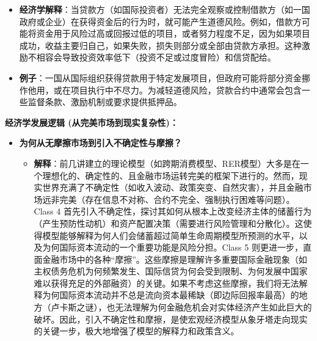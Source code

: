 \documentclass[12pt]{article}
\begin{document}
\begin{itemize}
    \begin{itemize}
        \item \textbf{经济学解释}：当贷款方（如国际投资者）无法完全观察或控制借款方（如一国政府或企业）在获得资金后的行为时，就可能产生道德风险。例如，借款方可能将资金用于风险过高或回报过低的项目，或者努力程度不足，因为如果项目成功，收益主要归自己，如果失败，损失则部分或全部由贷款方承担。这种激励不相容会导致投资效率低下（投资不足或过度冒险）和信贷配给。
        \item \textbf{例子}：一国从国际组织获得贷款用于特定发展项目，但政府可能将部分资金挪作他用，或在项目执行中不尽力。为减轻道德风险，贷款合约中通常会包含一些监督条款、激励机制或要求提供抵押品。
    \end{itemize}
\end{itemize}

\textbf{经济学发展逻辑 (从完美市场到现实复杂性)：}
\begin{itemize}
    \item \textbf{为何从无摩擦市场到引入不确定性与摩擦？}
    \begin{itemize}
        \item \textbf{解释}：前几讲建立的理论模型（如跨期消费模型、RER模型）大多是在一个理想化的、确定性的、且金融市场运转完美的框架下进行的。然而，现实世界充满了不确定性（如收入波动、政策突变、自然灾害），并且金融市场远非完美（存在信息不对称、合约不完全、强制执行困难等问题）。Class 4 首先引入不确定性，探讨其如何从根本上改变经济主体的储蓄行为（产生预防性动机）和资产配置决策（需要进行风险管理和分散化）。这使得模型能够解释为何人们会储蓄超过简单生命周期模型所预测的水平，以及为何国际资本流动的一个重要功能是风险分担。Class 5 则更进一步，直面金融市场中的各种“摩擦”。这些摩擦是理解许多重要国际金融现象（如主权债务危机为何频繁发生、国际信贷为何会受到限制、为何发展中国家难以获得充足的外部融资）的关键。如果不考虑这些摩擦，我们将无法解释为何国际资本流动并不总是流向资本最稀缺（即边际回报率最高）的地方（卢卡斯之谜），也无法理解为何金融危机会对实体经济产生如此巨大的破坏。因此，引入不确定性和摩擦，是使宏观经济模型从象牙塔走向现实的关键一步，极大地增强了模型的解释力和政策含义。
    \end{itemize}
\end{itemize}
\end{document}
